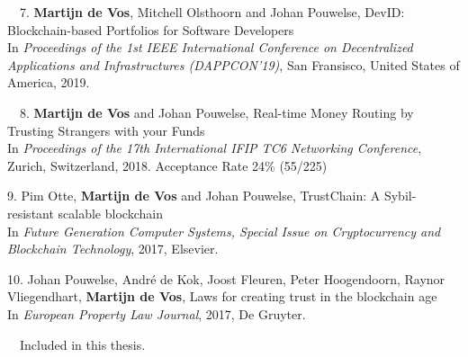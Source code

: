 \begin{etaremune}
{\item[\faFileTextO~~7.] \textbf{Martijn de Vos}, Mitchell Olsthoorn and Johan Pouwelse, DevID: Blockchain-based Portfolios for Software Developers\\
In \emph{Proceedings of the 1st IEEE International Conference on Decentralized Applications and Infrastructures (DAPPCON'19)}, San Fransisco, United States of America, 2019.

\item[\faFileTextO~~8.] \textbf{Martijn de Vos} and Johan Pouwelse, Real-time Money Routing by Trusting Strangers with your Funds\\
In \emph{Proceedings of the 17th International IFIP TC6 Networking Conference}, Zurich, Switzerland, 2018. Acceptance Rate 24\% (55/225)

\item[9.] Pim Otte, \textbf{Martijn de Vos} and Johan Pouwelse, TrustChain: A Sybil-resistant scalable blockchain\\
In \emph{Future Generation Computer Systems, Special Issue on Cryptocurrency and Blockchain Technology}, 2017, Elsevier.

\item[10.] Johan Pouwelse, André de Kok, Joost Fleuren, Peter Hoogendoorn, Raynor Vliegendhart, \textbf{Martijn de Vos}, Laws for creating trust in the blockchain age\\
In \emph{European Property Law Journal}, 2017, De Gruyter.

}\end{etaremune}

\vspace{0.5cm}
\noindent
\faFileTextO~~Included in this thesis.\\
